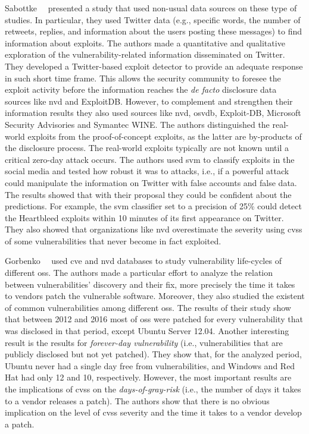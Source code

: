 Sabottke~\etal{}~\cite{Sabottke:2015} presented a study that used non-usual data sources on these type of studies.
In particular, they used Twitter data (e.g., specific words, the number of retweets, replies, and information about the users posting these messages) to find information about exploits. 
The authors made a quantitative and qualitative exploration of the vulnerability-related information disseminated on Twitter.
They developed a Twitter-based exploit detector to provide an adequate response in such short time frame. 
This allows the security community to foresee the exploit activity before the information reaches the \emph{de facto} disclosure data sources like \gls{nvd} and ExploitDB.
However, to complement and strengthen their information results they also used sources like \gls{nvd}, \gls{osvdb}, Exploit-DB, Microsoft Security Advisories and Symantec WINE. 
The authors distinguished the real-world exploits from the proof-of-concept exploits, as the latter are by-products of the disclosure process. 
The real-world exploits typically are not known until a critical zero-day attack occurs. 
The authors used \gls{svm} to classify exploits in the social media and tested how robust it was to attacks, i.e., if a powerful attack could manipulate the information on Twitter with false accounts and false data. 
The results showed that with their proposal they could be confident about the predictions. 
For example, the \gls{svm} classifier set to a precision of 25\% could detect the Heartbleed exploits within 10 minutes of its first appearance on Twitter. 
They also showed that organizations like \gls{nvd} overestimate the severity using \gls{cvss} of some vulnerabilities that never become in fact exploited.


Gorbenko~\etal{}~\cite{Gorbenko:2017} used \gls{cve} and \gls{nvd} databases to study vulnerability life-cycles of different \glspl{os}.
The authors made a particular effort to analyze the relation between vulnerabilities' discovery and their fix, more precisely the time it takes to vendors patch the vulnerable software.
Moreover, they also studied the existent of common vulnerabilities among different \glspl{os}.
The results of their study show that between 2012 and 2016 most of \glspl{os} were patched for every vulnerability that was disclosed in that period, except Ubuntu Server 12.04.
Another interesting result is the results for \emph{forever-day vulnerability} (i.e., vulnerabilities that are publicly disclosed but not yet patched). 
They show that, for the analyzed period, Ubuntu never had a single day free from vulnerabilities, and Windows and Red Hat had only 12 and 10, respectively.
However, the most important results are the implications of \gls{cvss} on the \emph{days-of-gray-risk} (i.e., the number of days it takes to a vendor releases a patch). 
The authors show that there is no obvious implication on the level of \gls{cvss} severity and the time it takes to a vendor develop a patch.



